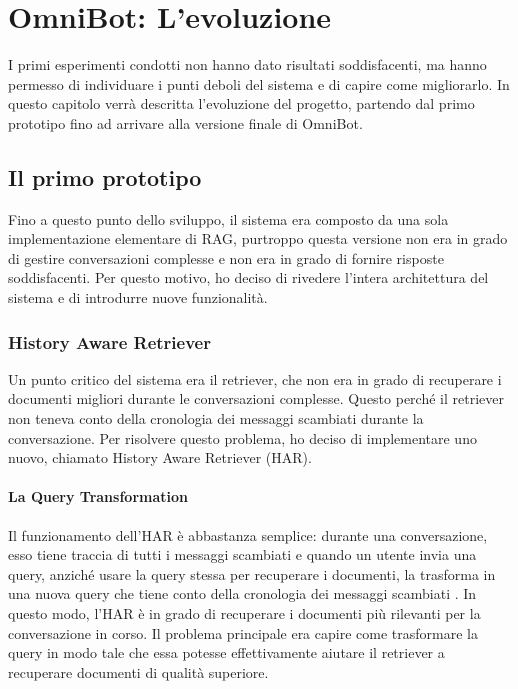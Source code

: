 \chapter{OmniBot: L'evoluzione}
I primi esperimenti condotti non hanno dato risultati soddisfacenti, ma hanno permesso di individuare i punti deboli del sistema e di capire come migliorarlo. In questo capitolo verrà descritta l'evoluzione del progetto, partendo dal primo prototipo fino ad arrivare alla versione finale di OmniBot.

\section{Il primo prototipo}
Fino a questo punto dello sviluppo, il sistema era composto da una sola implementazione elementare di RAG, purtroppo questa versione non era in grado di gestire conversazioni complesse e non era in grado di fornire risposte soddisfacenti. Per questo motivo, ho deciso di rivedere l'intera architettura del sistema e di introdurre nuove funzionalità.

\subsection{History Aware Retriever}
Un punto critico del sistema era il retriever, che non era in grado di recuperare i documenti migliori durante le conversazioni complesse. Questo perché il retriever non teneva conto della cronologia dei messaggi scambiati durante la conversazione. Per risolvere questo problema, ho deciso di implementare uno nuovo, chiamato History Aware Retriever (HAR).

\subsubsection{La Query Transformation}
Il funzionamento dell'HAR è abbastanza semplice: durante una conversazione, esso tiene traccia di tutti i messaggi scambiati e quando un utente invia una query, anziché usare la query stessa per recuperare i documenti, la trasforma in una nuova query che tiene conto della cronologia dei messaggi scambiati \cite{fu2023complexitybasedpromptingmultistepreasoning}. In questo modo, l'HAR è in grado di recuperare i documenti più rilevanti per la conversazione in corso.
Il problema principale era capire come trasformare la query in modo tale che essa potesse effettivamente aiutare il retriever a recuperare documenti di qualità superiore.

